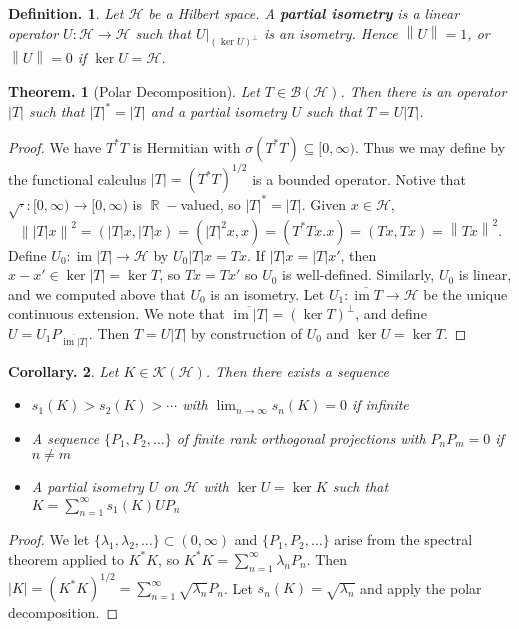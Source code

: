 \documentclass[11pt, a4paper]{memoir}
\DeclareMathOperator{\R}{{\mathbb{R}}}
\newcommand{\norm}[1]{\ensuremath{\left\lVert#1\right\rVert}}
\theoremstyle{change}
\newtheorem{theorem}{Theorem.}[section]
\newtheorem{corollary}[theorem]{Corollary.}
\theoremstyle{plain}
\theoremstyle{nonumberplain}
\newtheorem{definition}{Definition.}
\newtheorem{proof}{Proof}
\DeclareMathOperator{\im}{im}
\newcommand{\inr}[1]{\ensuremath{\left(#1\right)}}
\numberwithin{equation}{section}
\begin{document}
\begin{definition}
    Let $\mathcal{H}$ be a Hilbert space.
    A \textbf{partial isometry} is a linear operator $U:\mathcal{H}\to\mathcal{H}$ such that $U|_{(\ker U)^\perp}$ is an isometry.
    Hence $\norm{U}=1$, or $\norm{U}=0$ if $\ker U=\mathcal{H}$.
\end{definition}
\begin{theorem}[Polar Decomposition]
    Let $T\in\mathcal{B}(\mathcal{H})$.
    Then there is an operator $|T|$ such that $|T|^*=|T|$ and a partial isometry $U$ such that $T=U|T|$.
\end{theorem}
\begin{proof}
    We have $T^*T$ is Hermitian with $\sigma(T^*T)\subseteq[0,\infty)$.
    Thus we may define by the functional calculus $|T|=(T^*T)^{1/2}$ is a bounded operator.
    Notive that $\sqrt{\cdot}:[0,\infty)\to[0,\infty)$ is $\R-$valued, so $|T|^*=|T|$.
    Given $x\in\mathcal{H}$,
    \begin{equation*}
        \norm{|T|x}^2=\inr{|T|x,|T|x}=\inr{|T|^2x,x}=\inr{T^*Tx.x}=\inr{Tx,Tx}=\norm{Tx}^2.
    \end{equation*}
    Define $U_0:\im |T|\to\mathcal{H}$ by $U_0|T|x=Tx$.
    If $|T|x=|T|x'$, then $x-x'\in\ker|T|=\ker T$, so $Tx=Tx'$ so $U_0$ is well-defined.
    Similarly, $U_0$ is linear, and we computed above that $U_0$ is an isometry.
    Let $U_1:\overline{\im T}\to\mathcal{H}$ be the unique continuous extension.
    We note that $\overline{\im |T|}=(\ker T)^\perp$, and define $U=U_1P_{\overline{\im|T|}}$.
    Then $T=U|T|$ by construction of $U_0$ and $\ker U=\ker T$.
\end{proof}
\begin{corollary}
    Let $K\in\mathcal{K}(\mathcal{H})$.
    Then there exists a sequence
    \begin{itemize}[nl]
        \item $s_1(K)>s_2(K)>\cdots$ with $\lim_{n\to\infty}s_n(K)=0$ if infinite
        \item A sequence $\{P_1,P_2,\ldots\}$ of finite rank orthogonal projections with $P_nP_m=0$ if $n\neq m$
        \item A partial isometry $U$ on $\mathcal{H}$ with $\ker U=\ker K$ such that $K=\sum_{n=1}^\infty s_1(K) U P_n$
    \end{itemize}
\end{corollary}
\begin{proof}
    We let $\{\lambda_1,\lambda_2,\ldots\}\subset(0,\infty)$ and $\{P_1,P_2,\ldots\}$ arise from the spectral theorem applied to $K^*K$, so $K^*K=\sum_{n=1}^\infty\lambda_n P_n$.
    Then $|K|=(K^*K)^{1/2}=\sum_{n=1}^\infty\sqrt{\lambda_n}P_n$.
    Let $s_n(K)=\sqrt{\lambda_n}$ and apply the polar decomposition.
\end{proof}
\end{document}
